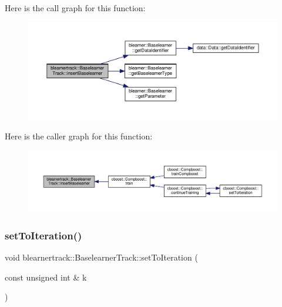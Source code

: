 Here is the call graph for this function\+:\nopagebreak
\begin{figure}[H]
\begin{center}
\leavevmode
\includegraphics[width=350pt]{classblearnertrack_1_1_baselearner_track_abc5f42093449e665b5b0dfeee8570953_cgraph}
\end{center}
\end{figure}
Here is the caller graph for this function\+:\nopagebreak
\begin{figure}[H]
\begin{center}
\leavevmode
\includegraphics[width=350pt]{classblearnertrack_1_1_baselearner_track_abc5f42093449e665b5b0dfeee8570953_icgraph}
\end{center}
\end{figure}
\mbox{\label{classblearnertrack_1_1_baselearner_track_a06f0ac986a158eecddce64e6c7af0750}} 
\subsubsection{\texorpdfstring{set\+To\+Iteration()}{setToIteration()}}
{\footnotesize\ttfamily void blearnertrack\+::\+Baselearner\+Track\+::set\+To\+Iteration (\begin{DoxyParamCaption}\item[{const unsigned int \&}]{k }\end{DoxyParamCaption})}

